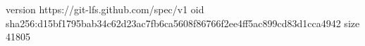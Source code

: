 version https://git-lfs.github.com/spec/v1
oid sha256:d15bf1795bab34c62d23ac7fb6ca5608f86766f2ee4ff5ac899cd83d1cca4942
size 41805
